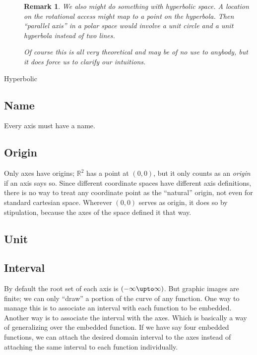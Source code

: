 \documentclass[12pt]{tufte-handout}
\numberwithin{equation}{subsection}
\numberwithin{equation}{subsection}
\newtheorem{remark}{Remark}
\newcommand\cspace{coordinate space}
\newcommand\Rtwo{\(\mathds{R}^2\)}
\begin{document}
\begin{description}
\begin{remark}
      We also might do something with hyperbolic space.  A location
      on the rotational access might map to a point on the
      hyperbola.  Then ``parallel axis'' in a polar space would
      involve a unit circle and a unit hyperbola instead of two
      lines.

      Of course this is all very theoretical and may be of no use to
      anybody, but it does force us to clarify our intuitions.
    \end{remark}

  \item[Hyperbolic]

  \end{description}

  \subsection{Name}
  \label{subs:axisname}

  Every axis must have a name.

  \subsection{Origin}
  \label{subs:axisorigin}

  Only axes have origins; \Rtwo{} has a point at \((0,0)\), but it only
  counts as an \textit{origin} if an axis says so.  Since
  different \cspace{}s have different axis definitions, there is no
  way to treat any coordinate point as the ``natural'' origin, not
  even for standard cartesian space.  Wherever \((0,0)\) serves as
  origin, it does so by stipulation, because the axes of the space
  defined it that way.

  \subsection{Unit}
  \label{subs:axisunit}

  \subsection{Interval}
  \label{subs:axisinterval}

  By default the root set of each axis is \((-\infty\upto\infty)\).
  But graphic images are finite; we can only ``draw'' a portion of the
  curve of any function.  One way to manage this is to associate an
  interval with each function to be embedded.  Another way is to
  associate the interval with the axes.  Which is basically a way of
  generalizing over the embedded function.  If we have say four
  embedded functions, we can attach the desired domain interval to the
  axes instead of attaching the same interval to each function
  individually.
\end{document}
